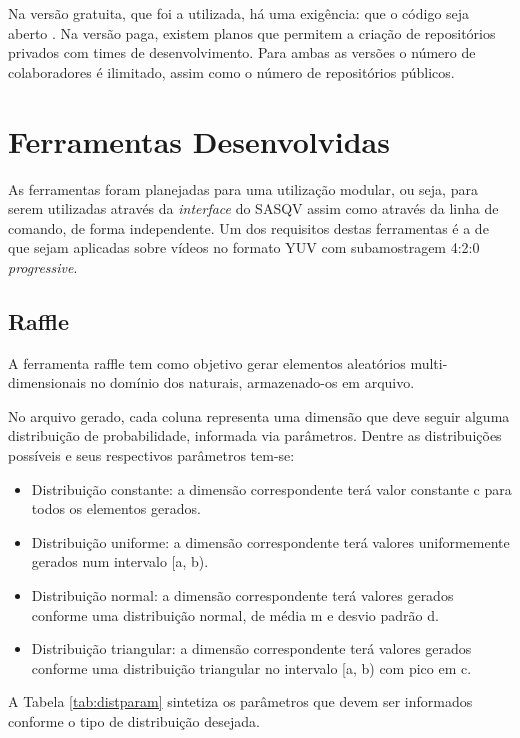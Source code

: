 Na versão gratuita, que foi a utilizada, há uma exigência: que o código seja aberto \cite{githubabout}. Na versão paga, existem planos que permitem a criação de repositórios privados com times de desenvolvimento. Para ambas as versões o número de colaboradores é ilimitado, assim como o número de repositórios públicos.

\section{Ferramentas Desenvolvidas}
\label{des:ferramentas}

As ferramentas foram planejadas para uma utilização modular, ou seja, para serem utilizadas através da \emph{interface} do SASQV assim como através da linha de comando, de forma independente. Um dos requisitos destas ferramentas é a de que sejam aplicadas sobre vídeos no formato YUV com subamostragem 4:2:0 \emph{progressive}.

\subsection{Raffle}
\label{des:raffle}

A ferramenta raffle tem como objetivo gerar elementos aleatórios multi-dimensionais no domínio dos naturais, armazenado-os em arquivo.

No arquivo gerado, cada coluna representa uma dimensão que deve seguir alguma distribuição de probabilidade, informada via parâmetros. Dentre as distribuições possíveis e seus respectivos parâmetros tem-se: 

\begin{itemize}
	\item Distribuição constante: a dimensão correspondente terá valor constante c para todos os elementos gerados.
	\item Distribuição uniforme: a dimensão correspondente terá valores uniformemente gerados num intervalo [a, b).
	\item Distribuição normal: a dimensão correspondente terá valores gerados conforme uma distribuição normal, de média m e desvio padrão d.
	\item Distribuição triangular: a dimensão correspondente terá valores gerados conforme uma distribuição triangular no intervalo [a, b) com pico em c.
\end{itemize}

A Tabela \ref{tab:distparam} sintetiza os parâmetros que devem ser informados conforme o tipo de distribuição desejada.

